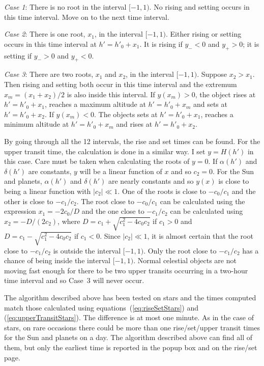 \documentclass[12pt]{article}
\begin{document}
{\em Case 1}: There is no root in the interval $[-1,1)$. No rising and setting 
occurs in this time interval. Move on to the next time interval. 

{\em Case 2}: There is one root, $x_1$, in the interval $[-1,1)$. Either rising or 
setting occurs in this time interval at $h'=h'_0+x_1$. It is rising if $y_-<0$ and 
$y_+>0$; it is setting if $y_->0$ and $y_+<0$. 

{\em Case 3}: There are two roots, $x_1$ and $x_2$, in the interval $[-1,1)$. Suppose 
$x_2>x_1$. Then rising and setting both occur in this time interval and the extremum 
$x_m=(x_1+x_2)/2$ is also inside this interval. If $y(x_m) > 0$, the object rises 
at $h'=h'_0+x_1$, reaches a maximum altitude at $h'=h'_0+x_m$ and sets at 
$h'=h'_0+x_2$. If $y(x_m)<0$. The objects sets at $h'=h'_0+x_1$, reaches 
a minimum altitude at $h'=h'_0+x_m$ and rises at $h'=h'_0+x_2$. 

By going through all the 12 intervals, the rise and set times can be found. 
For the upper transit time, the calculation is done in a similar way. I set 
$y = H(h')$ in this case. Care must be taken when calculating the roots of $y=0$. 
If $\alpha(h')$ and $\delta(h')$ are constants, $y$ will be a linear function of $x$ 
and so $c_2=0$. For the Sun and planets, $\alpha(h')$ and $\delta(h')$ 
are nearly constants and so $y(x)$ is close to being a linear function with $|c_2|\ll 1$. 
One of the roots is close to $-c_0/c_1$ and the other is close to $-c_1/c_2$. 
The root close to $-c_0/c_1$ can be calculated using the expression $x_1=-2c_0/D$ 
and the one close to $-c_1/c_2$ can be calculated using $x_2=-D/(2 c_2)$, where 
$D=c_1+\sqrt{c_1^2-4c_0c_2}$ if $c_1>0$ and $D=c_1-\sqrt{c_1^2-4c_0c_2}$ if $c_1<0$. 
Since $|c_2|\ll 1$, it is almost certain that the root close to $-c_1/c_2$ 
is outside the interval $[-1,1)$. Only the root close to $-c_1/c_2$ has a chance 
of being inside the interval $[-1,1)$. Normal celestial objects are not moving 
fast enough for there to be two upper transits occurring in a two-hour time interval 
and so Case~3 will never occur.

The algorithm described above has been tested on stars and the times computed 
match those calculated using equations~(\ref{eq:riseSetStars}) and 
(\ref{eq:upperTransitStars}). The difference is at most one minute.
As in the case of stars, on rare occasions there could be more than one 
rise/set/upper transit times for the Sun and planets on a day. The 
algorithm described above can find all of them, but only the earliest 
time is reported in the popup box and on the rise/set page.
\end{document}
